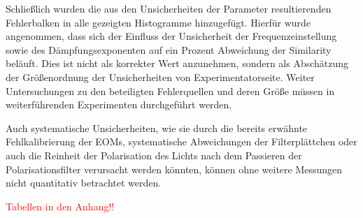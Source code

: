 Schließlich wurden die aus den Unsicherheiten der Parameter resultierenden 
Fehlerbalken in alle gezeigten Histogramme hinzugefügt. Hierfür wurde
angenommen, dass sich der Einfluss der Unsicherheit der Frequenzeinstellung
sowie des Dämpfungsexponenten auf ein Prozent Abweichung der Similarity
beläuft. Dies ist nicht als korrekter Wert anzunehmen, sondern als Abschätzung
der Größenordnung der Unsicherheiten von Experimentatorseite. Weiter
Untersuchungen zu den beteiligten Fehlerquellen und deren Größe müssen in
weiterführenden Experimenten durchgeführt werden.

Auch systematische Unsicherheiten, wie sie durch die bereits erwähnte
Fehlkalibrierung der EOMs, systematische Abweichungen der Filterplättchen oder
auch die Reinheit der Polarisation des Lichts nach dem Passieren der
Polarisationsfilter verursacht werden könnten, können ohne weitere Messungen
nicht quantitativ betrachtet werden.

\textcolor{red}{\Huge{Tabellen in den Anhang!!}}